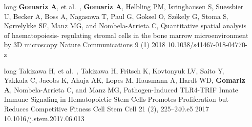 \begin{cvpublications}
\cvpublication 
{long}
{
    {\textbf{Gomariz A}, et al.~,}
    {\textbf{Gomariz A}, Helbling PM, Isringhausen S, Suessbier U, Becker A, Boss A, Nagasawa T, Paul G, Goksel O, Székely G, Stoma S, N{\o}rrelykke SF, Manz MG, and Nombela-Arrieta C,}
}
{Quantitative spatial analysis of haematopoiesis- regulating stromal cells in the bone marrow microenvironment by 3D microscopy}
{Nature Communications}
{9 (1)}
{2018}
{10.1038/s41467-018-04770-z}

\cvpublication 
{long}
{
    {Takizawa H, et al.~,}
    {Takizawa H, Fritsch K, Kovtonyuk LV, Saito Y, Yakkala C, Jacobs K, Ahuja AK, Lopes M, Hausmann A, Hardt WD, \textbf{Gomariz A}, Nombela-Arrieta C, and Manz MG,}
}
{Pathogen-Induced TLR4-TRIF Innate Immune Signaling in Hematopoietic Stem Cells Promotes Proliferation but Reduces Competitive Fitness}
{Cell Stem Cell}
{21 (2), 225–240.e5}
{2017}
{10.1016/j.stem.2017.06.013}

\end{cvpublications}

